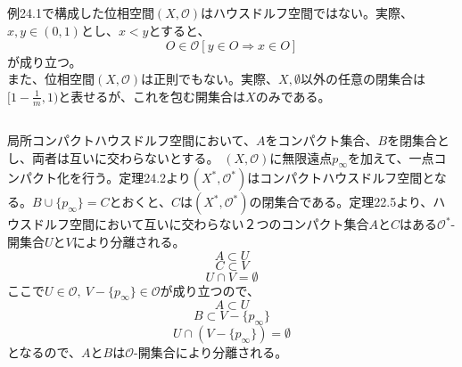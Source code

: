 \documentclass{jsarticle}
\begin{document}
\subsection{}
例24.1で構成した位相空間$(X,\mathcal{O})$はハウスドルフ空間ではない。実際、$x,y\in(0,1)$とし、$x<y$とすると、
\[O\in\mathcal{O}[y\in O\Rightarrow x\in O]\]
が成り立つ。\\
また、位相空間$(X,\mathcal{O})$は正則でもない。実際、$X,\emptyset$以外の任意の閉集合は$[1-\frac{1}{m},1)$と表せるが、これを包む開集合は$X$のみである。


\subsection{}
局所コンパクトハウスドルフ空間において、$A$をコンパクト集合、$B$を閉集合とし、両者は互いに交わらないとする。
$(X,\mathcal{O})$に無限遠点$p_\infty$を加えて、一点コンパクト化を行う。定理24.2より$(X^*,\mathcal{O}^*)$はコンパクトハウスドルフ空間となる。$B\cup\{ p_\infty\}=C$とおくと、$C$は$(X^*, \mathcal{O}^*)$の閉集合である。定理22.5より、ハウスドルフ空間において互いに交わらない２つのコンパクト集合$A$と$C$はある$\mathcal{O}^*$-開集合$U$と$V$により分離される。
\[A\subset U\]
\[C\subset V\]
\[U\cap V=\emptyset\]
ここで$U\in\mathcal{O},\ V-\{p_\infty\}\in\mathcal{O}$が成り立つので、
\[A\subset U\]
\[B\subset V-\{p_\infty\}\]
\[U\cap(V-\{p_\infty\})=\emptyset\]
となるので、$A$と$B$は$\mathcal{O}$-開集合により分離される。















































\newpage
\appendix
\end{document}
